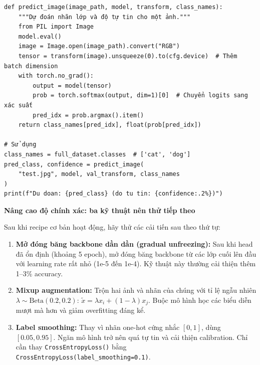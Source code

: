\begin{verbatim}
def predict_image(image_path, model, transform, class_names):
    """Dự đoán nhãn lớp và độ tự tin cho một ảnh."""
    from PIL import Image
    model.eval()
    image = Image.open(image_path).convert("RGB")
    tensor = transform(image).unsqueeze(0).to(cfg.device)  # Thêm batch dimension
    with torch.no_grad():
        output = model(tensor)
        prob = torch.softmax(output, dim=1)[0]  # Chuyển logits sang xác suất
        pred_idx = prob.argmax().item()
    return class_names[pred_idx], float(prob[pred_idx])

# Sử dụng
class_names = full_dataset.classes  # ['cat', 'dog']
pred_class, confidence = predict_image(
    "test.jpg", model, val_transform, class_names
)
print(f"Du doan: {pred_class} (do tu tin: {confidence:.2%})")
\end{verbatim}

\begin{mdframed}[style=infobox]
\textbf{Nâng cao độ chính xác: ba kỹ thuật nên thử tiếp theo}

Sau khi recipe cơ bản hoạt động, hãy thử các cải tiến sau theo thứ tự:

\begin{enumerate}
    \item \textbf{Mở đóng băng backbone dần dần (gradual unfreezing):} Sau khi head đã ổn định (khoảng 5 epoch), mở đóng băng backbone từ các lớp cuối lên đầu với learning rate rất nhỏ (1e-5 đến 1e-4). Kỹ thuật này thường cải thiện thêm 1--3\% accuracy.

    \item \textbf{Mixup augmentation:} Trộn hai ảnh và nhãn của chúng với tỉ lệ ngẫu nhiên $\lambda \sim \text{Beta}(0.2, 0.2)$: $\tilde{x} = \lambda x_i + (1-\lambda) x_j$. Buộc mô hình học các biểu diễn mượt mà hơn và giảm overfitting đáng kể.

    \item \textbf{Label smoothing:} Thay vì nhãn one-hot cứng nhắc $[0, 1]$, dùng $[0.05, 0.95]$. Ngăn mô hình trở nên quá tự tin và cải thiện calibration. Chỉ cần thay \texttt{CrossEntropyLoss()} bằng \texttt{CrossEntropyLoss(label\_smoothing=0.1)}.
\end{enumerate}
\end{mdframed}
